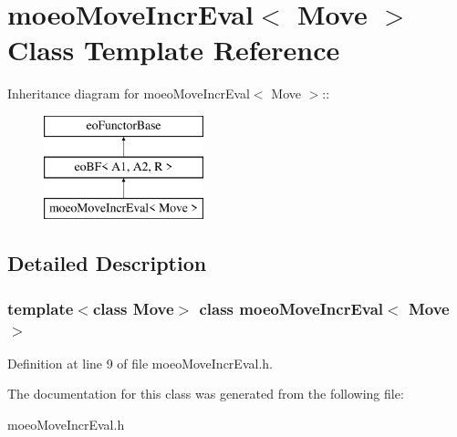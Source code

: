 \section{moeo\-Move\-Incr\-Eval$<$ Move $>$ Class Template Reference}
\label{classmoeoMoveIncrEval}
Inheritance diagram for moeo\-Move\-Incr\-Eval$<$ Move $>$::\begin{figure}[H]
\begin{center}
\leavevmode
\includegraphics[height=3cm]{classmoeoMoveIncrEval}
\end{center}
\end{figure}


\subsection{Detailed Description}
\subsubsection*{template$<$class Move$>$ class moeo\-Move\-Incr\-Eval$<$ Move $>$}





Definition at line 9 of file moeo\-Move\-Incr\-Eval.h.

The documentation for this class was generated from the following file:\begin{CompactItemize}
\item 
moeo\-Move\-Incr\-Eval.h\end{CompactItemize}
